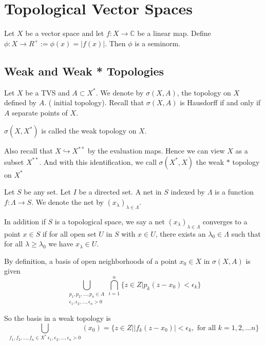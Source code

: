 
\chapter{Topological Vector Spaces}

\begin{example}
  Let $X$ be a vector space and let $f: X \to \mathbb{C}$ be a linear
  map. Define $\phi: X \to R^{+} := \phi(x) = |f(x)|$. Then $\phi$ is
  a seminorm.
\end{example}

\section{Weak and Weak * Topologies}
\begin{remark}
  Let $X$ be a TVS and $A \subset X^{*}$. We denote by $ \sigma(X,
  A)$, the topology on $X$ defined by $A$. ( initial topology).
  Recall that $\sigma(X, A)$ is Hausdorff if and only if $A$ separate
  points of $X$.

  $\sigma(X, X^{*})$ is called the weak topology on $X$.

  Also recall that $X \hookrightarrow X^{**}$ by the evaluation maps.
  Hence we can view $X$ as a subset $X^{**}$. And with this
  identification, we call $\sigma(X^{*}, X)$ the weak $*$ topology on $X^{*}$

\end{remark}

\begin{definition}
  Let $S$ be any set. Let $I$ be a directed set. A net in $S$ indexed
  by $\Lambda$ is a function $f:\Lambda \to S$. We denote the net by
  $(x_\lambda)_{\lambda \in \Lambda}$.

  In addition if $S$ is a topological space, we say a net
  $(x_\lambda)_{\lambda \in \Lambda}$ converges to a point $x \in S$
  if  for all open set $U$ in $S$ with $x \in U$, there exists an
  $\lambda_0 \in \Lambda$ such that for all $\lambda \ge \lambda_0$
  we have $x_\lambda \in U$.
\end{definition}


\begin{remark}
  By definition, a basis of open neighborhoods of a point $x_0 \in X$
  in $\sigma(X, A)$ is given \[
    \bigcup_{\substack{p_1 , p_2 , \ldots , p_n \in A \\ \epsilon_1 ,
    \epsilon_2 , \ldots , \epsilon_n > 0}}\bigcap_{i = 1}^{n} \{ z
    \in Z | p_k(z-x_0) < \epsilon_k \}
  \]

  So the basis in a weak topology is \[
    \bigcup_{f_1 , f_2 , \ldots , f_n \in X^{*} \ \epsilon_1 ,
    \epsilon_2 , \ldots , \epsilon_n > 0}(x_0) = \{  z \in Z \Big|
    |f_k(z- x_0)|< \epsilon_k, \textrm{ for all } k = 1, 2, \ldots n \}
  \]
\end{remark}

